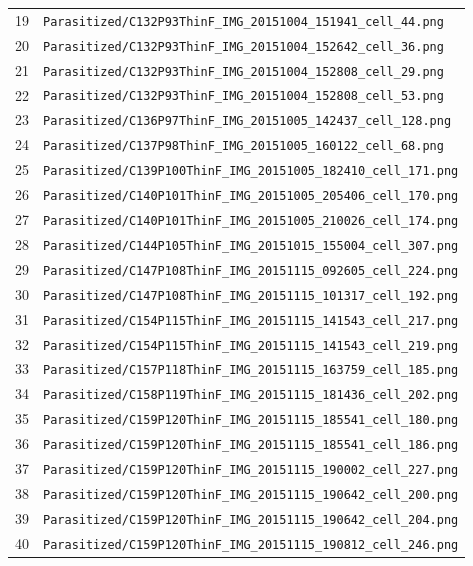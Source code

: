 \begin{longtable}{r p{12cm}}
19 & \texttt{Parasitized/C132P93ThinF\_IMG\_20151004\_151941\_cell\_44.png} \\
20 & \texttt{Parasitized/C132P93ThinF\_IMG\_20151004\_152642\_cell\_36.png} \\
21 & \texttt{Parasitized/C132P93ThinF\_IMG\_20151004\_152808\_cell\_29.png} \\
22 & \texttt{Parasitized/C132P93ThinF\_IMG\_20151004\_152808\_cell\_53.png} \\
23 & \texttt{Parasitized/C136P97ThinF\_IMG\_20151005\_142437\_cell\_128.png} \\
24 & \texttt{Parasitized/C137P98ThinF\_IMG\_20151005\_160122\_cell\_68.png} \\
25 & \texttt{Parasitized/C139P100ThinF\_IMG\_20151005\_182410\_cell\_171.png} \\
26 & \texttt{Parasitized/C140P101ThinF\_IMG\_20151005\_205406\_cell\_170.png} \\
27 & \texttt{Parasitized/C140P101ThinF\_IMG\_20151005\_210026\_cell\_174.png} \\
28 & \texttt{Parasitized/C144P105ThinF\_IMG\_20151015\_155004\_cell\_307.png} \\
29 & \texttt{Parasitized/C147P108ThinF\_IMG\_20151115\_092605\_cell\_224.png} \\
30 & \texttt{Parasitized/C147P108ThinF\_IMG\_20151115\_101317\_cell\_192.png} \\
31 & \texttt{Parasitized/C154P115ThinF\_IMG\_20151115\_141543\_cell\_217.png} \\
32 & \texttt{Parasitized/C154P115ThinF\_IMG\_20151115\_141543\_cell\_219.png} \\
33 & \texttt{Parasitized/C157P118ThinF\_IMG\_20151115\_163759\_cell\_185.png} \\
34 & \texttt{Parasitized/C158P119ThinF\_IMG\_20151115\_181436\_cell\_202.png} \\
35 & \texttt{Parasitized/C159P120ThinF\_IMG\_20151115\_185541\_cell\_180.png} \\
36 & \texttt{Parasitized/C159P120ThinF\_IMG\_20151115\_185541\_cell\_186.png} \\
37 & \texttt{Parasitized/C159P120ThinF\_IMG\_20151115\_190002\_cell\_227.png} \\
38 & \texttt{Parasitized/C159P120ThinF\_IMG\_20151115\_190642\_cell\_200.png} \\
39 & \texttt{Parasitized/C159P120ThinF\_IMG\_20151115\_190642\_cell\_204.png} \\
40 & \texttt{Parasitized/C159P120ThinF\_IMG\_20151115\_190812\_cell\_246.png} \\

\end{longtable}
